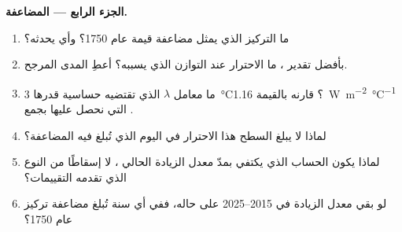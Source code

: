 \begin{problem}
\medskip
\noindent\textbf{الجزء الرابع --- المضاعفة.}
\begin{enumerate}[resume]
  \item ما التركيز الذي يمثل مضاعفة قيمة عام 1750؟ وأي
         يحدثه؟
  \item بأفضل تقدير ،
        ما الاحترار عند التوازن الذي يسببه؟ أعطِ المدى المرجح.
  \item ما معامل  $\lambda$ الذي تقتضيه حساسية قدرها
        \qty{3}{\degreeCelsius}؟ قارنه بالقيمة
        \qty{1.16}{W.m^{-2}.\degreeCelsius^{-1}} التي نحصل عليها بجمع
        .
  \item لماذا لا يبلغ السطح هذا الاحترار في اليوم الذي
        تُبلغ فيه المضاعفة؟
  \item لماذا يكون الحساب الذي يكتفي بمدّ معدل الزيادة الحالي ،
        لا إسقاطًا من النوع الذي تقدمه التقييمات؟
  \item لو بقي معدل الزيادة في 2015--2025 على حاله، ففي أي سنة
        تُبلغ مضاعفة تركيز عام 1750؟
\end{enumerate}
\end{problem}
